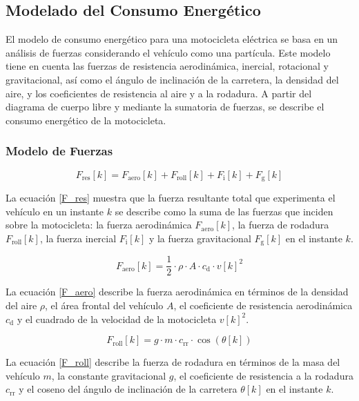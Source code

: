 \subsection{Modelado del Consumo Energético}

El modelo de consumo energético para una motocicleta eléctrica se basa en un análisis de fuerzas considerando el vehículo como una partícula. Este modelo tiene en cuenta las fuerzas de resistencia aerodinámica, inercial, rotacional y gravitacional, así como el ángulo de inclinación de la carretera, la densidad del aire, y los coeficientes de resistencia al aire y a la rodadura. A partir del diagrama de cuerpo libre y mediante la sumatoria de fuerzas, se describe el consumo energético de la motocicleta.

\subsubsection{Modelo de Fuerzas}

\begin{equation} 
    F_{\mathrm{res}}[k] = F_{\mathrm{aero}}[k] + F_{\mathrm{roll}}[k] + F_{\mathrm{i}}[k] + F_{\mathrm{g}}[k]
    \label{F_res}
\end{equation}

La ecuación \eqref{F_res} muestra que la fuerza resultante total que experimenta el vehículo en un instante $k$ se describe como la suma de las fuerzas que inciden sobre la motocicleta: la fuerza aerodinámica $F_{\mathrm{aero}}[k]$, la fuerza de rodadura $F_{\mathrm{roll}}[k]$, la fuerza inercial $F_{\mathrm{i}}[k]$ y la fuerza gravitacional $F_{\mathrm{g}}[k]$ en el instante $k$.

\begin{equation} 
    F_{\mathrm{aero}}[k] = \frac{1}{2} \cdot \rho \cdot A \cdot c_{\mathrm{d}} \cdot v[k]^2
    \label{F_aero}
\end{equation}

La ecuación \eqref{F_aero} describe la fuerza aerodinámica en términos de la densidad del aire $\rho$, el área frontal del vehículo $A$, el coeficiente de resistencia aerodinámica $c_{\mathrm{d}}$ y el cuadrado de la velocidad de la motocicleta $v[k]^2$.

\begin{equation} 
    F_{\mathrm{roll}}[k] = g \cdot m \cdot c_{\mathrm{rr}} \cdot \cos(\theta[k])
    \label{F_roll}
\end{equation}

La ecuación \eqref{F_roll} describe la fuerza de rodadura en términos de la masa del vehículo $m$, la constante gravitacional $g$, el coeficiente de resistencia a la rodadura $c_{\mathrm{rr}}$ y el coseno del ángulo de inclinación de la carretera $\theta[k]$ en el instante $k$.

